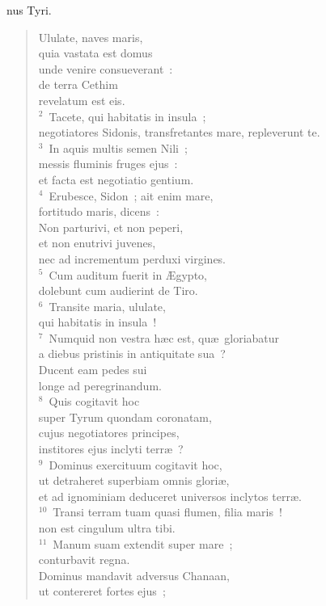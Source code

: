 \bchapter
{}nus Tyri. \begin{verse}Ululate, naves maris,\\ quia vastata est domus\\ unde venire consueverant~:\\ de terra Cethim\\ revelatum est eis.\\
${}^{2}$~Tacete, qui habitatis in insula~;\\ negotiatores Sidonis, transfretantes mare, repleverunt te.\\
${}^{3}$~In aquis multis semen Nili~;\\ messis fluminis fruges ejus~:\\ et facta est negotiatio gentium.\\
${}^{4}$~Erubesce, Sidon~; ait enim mare,\\ fortitudo maris, dicens~:\\ Non parturivi, et non peperi,\\ et non enutrivi juvenes,\\ nec ad incrementum perduxi virgines.\\
${}^{5}$~Cum auditum fuerit in \AE gypto,\\ dolebunt cum audierint de Tiro.\\
${}^{6}$~Transite maria, ululate,\\ qui habitatis in insula~!\\
${}^{7}$~Numquid non vestra h\ae c est, qu\ae\ gloriabatur\\ a diebus pristinis in antiquitate sua~?\\ Ducent eam pedes sui\\ longe ad peregrinandum.\\
${}^{8}$~Quis cogitavit hoc\\ super Tyrum quondam coronatam,\\ cujus negotiatores principes,\\ institores ejus inclyti terr\ae~?\\
${}^{9}$~Dominus exercituum cogitavit hoc,\\ ut detraheret superbiam omnis glori\ae ,\\ et ad ignominiam deduceret universos inclytos terr\ae .\\
${}^{10}$~Transi terram tuam quasi flumen, filia maris~!\\ non est cingulum ultra tibi.\\
${}^{11}$~Manum suam extendit super mare~;\\ conturbavit regna.\\ Dominus mandavit adversus Chanaan,\\ ut contereret fortes ejus~;\\

\end{verse}

